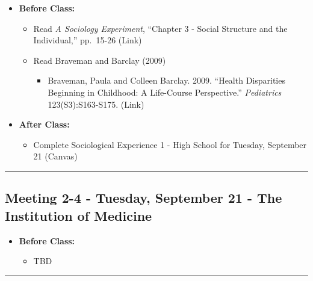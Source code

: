 \documentclass[
]{book}
\providecommand{\tightlist}{%
  \setlength{\itemsep}{0pt}\setlength{\parskip}{0pt}}
\begin{document}
\begin{itemize}
\tightlist
\item
  \textbf{Before Class:}

  \begin{itemize}
  \tightlist
  \item
    Read \emph{A Sociology Experiment}, ``Chapter 3 - Social Structure and the Individual,'' pp.~15-26 (Link)
  \item
    Read Braveman and Barclay (2009)

    \begin{itemize}
    \tightlist
    \item
      Braveman, Paula and Colleen Barclay. 2009. ``Health Disparities Beginning in Childhood: A Life-Course Perspective.'' \emph{Pediatrics} 123(S3):S163-S175. (Link)
    \end{itemize}
  \end{itemize}
\item
  \textbf{After Class:}

  \begin{itemize}
  \tightlist
  \item
    Complete Sociological Experience 1 - High School for Tuesday, September 21 (Canvas)
  \end{itemize}
\end{itemize}

\begin{center}\rule{0.5\linewidth}{0.5pt}\end{center}

\hypertarget{meeting-2-4---tuesday-september-21---the-institution-of-medicine}{%
\subsection*{Meeting 2-4 - Tuesday, September 21 - The Institution of Medicine}\label{meeting-2-4---tuesday-september-21---the-institution-of-medicine}}

\begin{itemize}
\tightlist
\item
  \textbf{Before Class:}

  \begin{itemize}
  \tightlist
  \item
    TBD
  \end{itemize}
\end{itemize}

\begin{center}\rule{0.5\linewidth}{0.5pt}\end{center}
\end{document}
